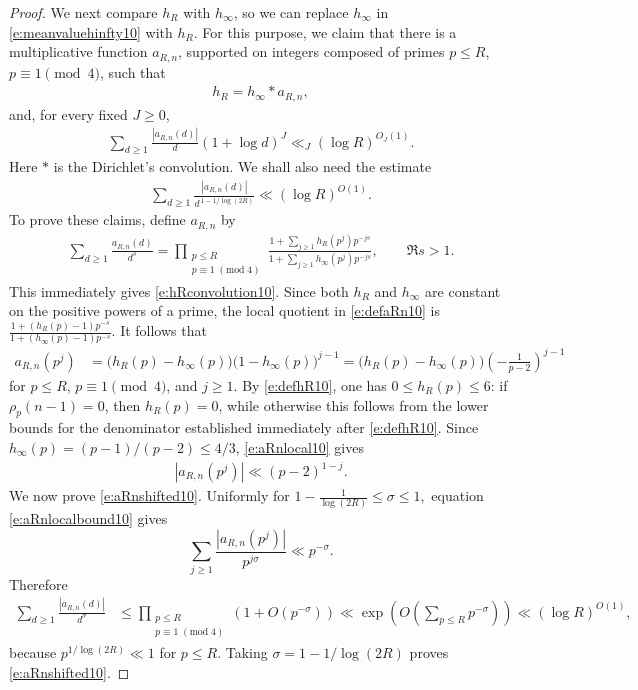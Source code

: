 \documentclass[12pt,reqno]{amsart}
\numberwithin{equation}{section}
\theoremstyle{definition}
\theoremstyle{remark}
\begin{document}
\begin{proof}
We next compare \(h_R\) with \(h_\infty\), so we can replace $h_{\infty}$ in \eqref{e:meanvaluehinfty10} with $h_R$.  For this purpose, we
claim that there is a multiplicative function \(a_{R,n}\), supported
on integers composed of primes \(p\leq R\), \(p\equiv1\pmod4\), such
that
\begin{align}\label{e:hRconvolution10}
 h_R=h_\infty*a_{R,n},
\end{align}
and, for every fixed \(J\geq0\),
\begin{align}\label{e:aRnmoments10}
 \sum_{d\geq1}
 \frac{|a_{R,n}(d)|}{d}(1+\log d)^J
 \ll_J(\log R)^{O_J(1)}.
\end{align}
Here $*$ is the Dirichlet's convolution. We shall also need the estimate
\begin{align}\label{e:aRnshifted10}
 \sum_{d\geq1}
 \frac{|a_{R,n}(d)|}
 {d^{\,1-1/\log(2R)}}
 \ll(\log R)^{O(1)}.
\end{align}
To prove these claims, define \(a_{R,n}\) by
\begin{align}\label{e:defaRn10}
 \sum_{d\geq1}\frac{a_{R,n}(d)}{d^s}
 =
 \prod_{\substack{p\leq R\\p\equiv1\;(\mathrm{mod}\;4)}}
 \frac{
  1+\sum_{j\geq1}h_R(p^j)p^{-js}
 }{
  1+\sum_{j\geq1}h_\infty(p^j)p^{-js}
 },
 \qquad \Re s>1.
\end{align}
This immediately gives \eqref{e:hRconvolution10}.  Since both
\(h_R\) and \(h_\infty\) are constant on the positive powers of a
prime, the local quotient in \eqref{e:defaRn10} is $ \frac{1+(h_R(p)-1)p^{-s}}
      {1+(h_\infty(p)-1)p^{-s}}.$
It follows that
\begin{align}\label{e:aRnlocal10}
 a_{R,n}(p^j)
 &=
 \bigl(h_R(p)-h_\infty(p)\bigr)
 \bigl(1-h_\infty(p)\bigr)^{j-1}=
 \bigl(h_R(p)-h_\infty(p)\bigr)
 \left(-\frac1{p-2}\right)^{j-1}
\end{align}
for \(p\leq R\), \(p\equiv1\pmod4\), and \(j\geq1\).
By \eqref{e:defhR10}, one has \(0\leq h_R(p)\leq6\):
if \(\rho_p(n-1)=0\), then \(h_R(p)=0\), while otherwise this follows
from the lower bounds for the denominator established immediately
after \eqref{e:defhR10}.  Since
\(h_\infty(p)=(p-1)/(p-2)\leq4/3\), \eqref{e:aRnlocal10} gives
\begin{align}\label{e:aRnlocalbound10}
 |a_{R,n}(p^j)|\ll(p-2)^{1-j}.
\end{align}
We now prove \eqref{e:aRnshifted10}.  Uniformly for $ 1-\frac1{\log(2R)}\leq\sigma\leq1,$
equation \eqref{e:aRnlocalbound10} gives
\[
 \sum_{j\geq1}
 \frac{|a_{R,n}(p^j)|}{p^{j\sigma}}
 \ll p^{-\sigma}.
\]
Therefore
\begin{align*}
 \sum_{d\geq1}\frac{|a_{R,n}(d)|}{d^\sigma}
 &\leq
 \prod_{\substack{p\leq R\\p\equiv1\;(\mathrm{mod}\;4)}}
 \left(1+O(p^{-\sigma})\right)\ll
 \exp\left(O\left(\sum_{p\leq R}p^{-\sigma}\right)\right)
 \ll(\log R)^{O(1)},
\end{align*}
because $p^{1/\log(2R)}\ll1$ for $p\leq R$.
Taking \(\sigma=1-1/\log(2R)\) proves
\eqref{e:aRnshifted10}.


\end{proof}
\end{document}

